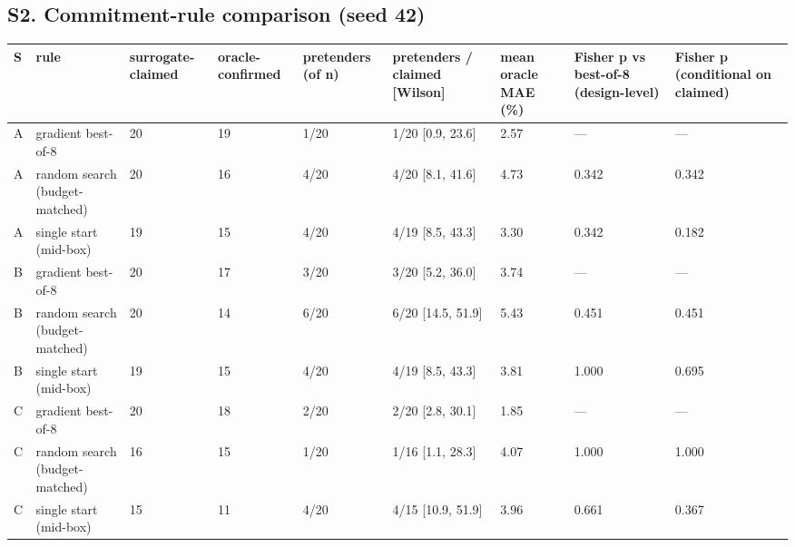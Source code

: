 \documentclass[11pt,a4paper]{article}
\newcounter{none}   %
\begin{document}
\begin{landscape}
\section*{S2. Commitment-rule comparison (seed 42)}

\begingroup
\setlength{\tabcolsep}{2pt}\tiny
{}
\label{stab:2}
{\def\LTcaptype{none} %
\begin{longtable}[]{@{}lllllllll@{}}
\toprule\noalign{}
S & rule & surrogate-claimed & oracle-confirmed & pretenders (of n) & pretenders / claimed {[}Wilson{]} & mean oracle MAE (\%) & Fisher p vs best-of-8 (design-level) & Fisher p (conditional on claimed) \\
\midrule\noalign{}
\endhead
\bottomrule\noalign{}
\endlastfoot
A & gradient best-of-8 & 20 & 19 & 1/20 & 1/20 {[}0.9, 23.6{]} & 2.57 & --- & --- \\
A & random search (budget-matched) & 20 & 16 & 4/20 & 4/20 {[}8.1, 41.6{]} & 4.73 & 0.342 & 0.342 \\
A & single start (mid-box) & 19 & 15 & 4/20 & 4/19 {[}8.5, 43.3{]} & 3.30 & 0.342 & 0.182 \\
B & gradient best-of-8 & 20 & 17 & 3/20 & 3/20 {[}5.2, 36.0{]} & 3.74 & --- & --- \\
B & random search (budget-matched) & 20 & 14 & 6/20 & 6/20 {[}14.5, 51.9{]} & 5.43 & 0.451 & 0.451 \\
B & single start (mid-box) & 19 & 15 & 4/20 & 4/19 {[}8.5, 43.3{]} & 3.81 & 1.000 & 0.695 \\
C & gradient best-of-8 & 20 & 18 & 2/20 & 2/20 {[}2.8, 30.1{]} & 1.85 & --- & --- \\
C & random search (budget-matched) & 16 & 15 & 1/20 & 1/16 {[}1.1, 28.3{]} & 4.07 & 1.000 & 1.000 \\
C & single start (mid-box) & 15 & 11 & 4/20 & 4/15 {[}10.9, 51.9{]} & 3.96 & 0.661 & 0.367 \\
\end{longtable}
}
\endgroup
\end{landscape}
\end{document}
